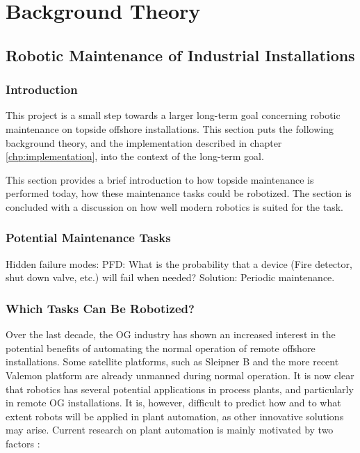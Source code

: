 \chapter{Background Theory}
\label{chp:theory} 

\section{Robotic Maintenance of Industrial Installations}

\subsection{Introduction}

This project is a small step towards a larger long-term goal concerning robotic maintenance on topside offshore installations. This section puts the following background theory, and the implementation described in chapter \ref{chp:implementation}, into the context of the long-term goal. 

This section provides a brief introduction to how topside maintenance is performed today, how these maintenance tasks could be robotized. The section is concluded with a discussion on how well modern robotics is suited for the task. 

\subsection{Potential Maintenance Tasks}

Hidden failure modes: PFD: What is the probability that a device (Fire detector, shut down valve, etc.) will fail when needed? 
Solution: Periodic maintenance.

\subsection{Which Tasks Can Be Robotized?}


Over the last decade, the \ac{OG} industry has shown an increased interest in the potential benefits of automating the normal operation of remote offshore installations. Some satellite platforms, such as Sleipner B and the more recent Valemon platform are already unmanned during normal operation. It is now clear that robotics has several potential applications in process plants, and particularly in remote \ac{OG} installations. It is, however, difficult to predict how and to what extent robots will be applied in plant automation, as other innovative solutions may arise\cite{statoil_ubemannet}\cite{subsea_konkurranse}\cite{E24}. Current research on plant automation is mainly motivated by two factors\cite{AutonomousOG} \cite{StepwiseApproachToRobotics}:


